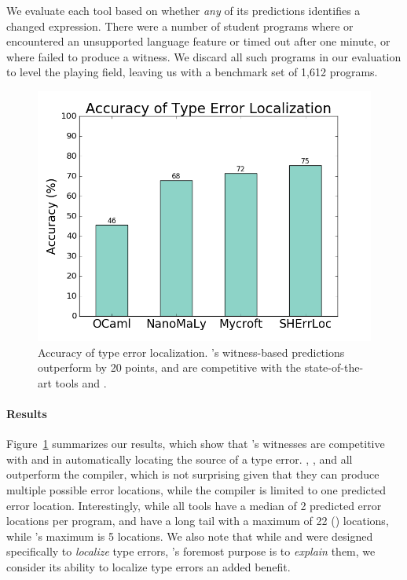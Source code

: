 We evaluate each tool based on whether \emph{any} of its predictions
identifies a changed expression.
%
There were a number of student programs where \mycroft or \sherrloc
encountered an unsupported language feature or timed out after one
minute, or where \toolname failed to produce a witness.
%
We discard all such programs in our evaluation to level the playing
field, leaving us with a benchmark set of 1,612 programs.

\begin{figure}[t]
\includegraphics[width=0.8\linewidth]{blame.png}
\caption{Accuracy of type error localization. \toolname's witness-based
  predictions outperform \ocaml by 20 points, and are competitive
  with the state-of-the-art tools \mycroft and \sherrloc.}
\label{fig:results-blame}
\end{figure}

\paragraph{Results}
Figure~\ref{fig:results-blame} summarizes our results, which show that
\toolname's witnesses are competitive with \mycroft and \sherrloc in
automatically locating the source of a type error.
%
\toolname, \mycroft, and \sherrloc all outperform the \ocaml compiler,
which is not surprising given that they can produce multiple possible
error locations, while the \ocaml compiler is limited to one predicted
error location.
%
Interestingly, while all tools have a median of 2 predicted error
locations per program, \mycroft and \sherrloc have a long tail with a
maximum of 22 () locations, while \toolname's maximum is 5
locations.
%
We also note that while \mycroft and \sherrloc were designed
specifically to \emph{localize} type errors, \toolname's foremost
purpose is to \emph{explain} them, we consider its ability to localize
type errors an added benefit.

